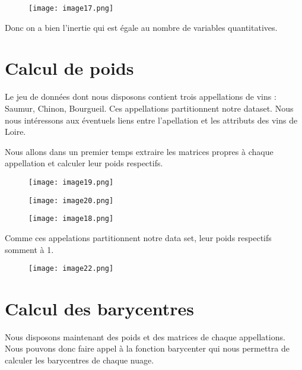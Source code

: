 \documentclass{article}
\begin{document}
\begin{figure}[H]
    \centering
    \texttt{[image: image17.png]}
    \label{fig:enter-label}
\end{figure}

Donc on a bien l'inertie qui est égale au nombre de variables quantitatives.

\section{Calcul de poids}

Le jeu de données dont nous disposons contient trois appellations de vins : Saumur, Chinon, Bourgueil. Ces appellations partitionnent notre dataset. Nous nous intéressons aux éventuels liens entre l'apellation et les attributs des vins de Loire.

Nous allons dans un premier temps extraire les matrices propres à chaque appellation et calculer leur poids respectifs.

\begin{figure}[H]
    \centering
    \texttt{[image: image19.png]}
    \label{fig:enter-label}
\end{figure}

\begin{figure}[H]
    \centering
    \texttt{[image: image20.png]}
    \label{fig:enter-label}
\end{figure}

\begin{figure}[H]
    \centering
    \texttt{[image: image18.png]}
    \label{fig:enter-label}
\end{figure}

Comme ces appelations partitionnent notre data set, leur poids respectifs somment à 1.

\begin{figure}[H]
    \centering
    \texttt{[image: image22.png]}
    \label{fig:enter-label}
\end{figure}

\section{Calcul des barycentres}

Nous disposons maintenant des poids et des matrices de chaque appellations. Nous pouvons donc faire appel à la fonction barycenter qui nous permettra de calculer les barycentres de chaque nuage.
\end{document}
